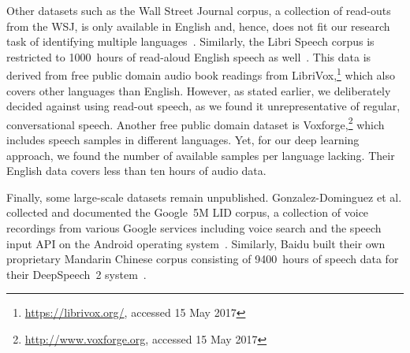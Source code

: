 Other datasets such as the Wall Street Journal corpus, a collection of read-outs from the WSJ, is only available in English and, hence, does not fit our research task of identifying multiple languages~\cite{charniak2000bllip}. Similarly, the Libri Speech corpus is restricted to \num{1000}~hours of read-aloud English speech as well~\cite{panayotov2015librispeech}. This data is derived from free public domain audio book readings from LibriVox,\footnote{\url{https://librivox.org/}, accessed 15 May 2017} which also covers other languages than English. However, as stated earlier, we deliberately decided against using read-out speech, as we found it unrepresentative of regular, conversational speech. Another free public domain dataset is Voxforge,\footnote{\url{http://www.voxforge.org}, accessed 15 May 2017} which includes speech samples in different languages. Yet, for our deep learning approach, we found the number of available samples per language lacking. Their English data covers less than ten hours of audio data.

Finally, some large-scale datasets remain unpublished. Gonzalez-Dominguez et al. collected and documented the Google~5M LID corpus, a collection of voice recordings from various Google services including voice search and the speech input API on the Android operating system~\cite{gonzalez2015frame, gonzalez2015real}. Similarly, Baidu built their own proprietary Mandarin Chinese corpus consisting of \num{9400}~hours of speech data for their DeepSpeech~2 system~\cite{amodei2015deep}.
